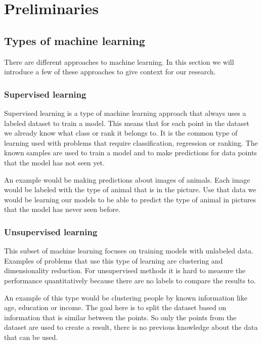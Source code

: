 \chapter{Preliminaries}\label{ch:preliminaries}

\section{Types of machine learning}
\label{sec:prelim:types-of-machine-learning}

There are different approaches to machine learning. In this section we will introduce a few of these approaches to give context for our research.


\subsection{Supervised learning}

Supervised learning \cite{mohri_foundations_2012} is a type of machine learning approach that always uses a labeled dataset to train a model. This means that for each point in the dataset we already know what class or rank it belongs to. It is the common type of learning used with problems that require classification, regression or ranking. The known samples are used to train a model and to make predictions for data points that the model has not seen yet.

An example would be making predictions about images of animals. Each image would be labeled with the type of animal that is in the picture. Use that data we would be learning our models to be able to predict the type of animal in pictures that the model has never seen before.

\subsection{Unsupervised learning}

This subset of machine learning focuses on training models with unlabeled data. Examples of problems that use this type of learning are clustering and dimensionality reduction. For unsupervised methods it is hard to measure the performance quantitatively because there are no labels to compare the results to.

An example of this type would be clustering people by known information like age, education or income. The goal here is to split the dataset based on information that is similar between the points. So only the points from the dataset are used to create a result, there is no previous knowledge about the data that can be used.

